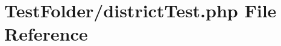 \hypertarget{district_test_8php}{}\section{Test\+Folder/district\+Test.php File Reference}
\label{district_test_8php}
